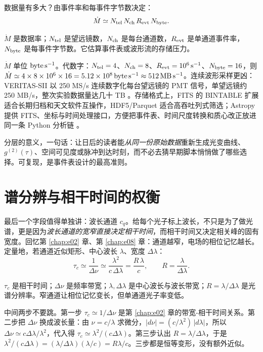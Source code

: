 数据量有多大？由事件率和每事件字节数决定：
\begin{equation}
  \dot{M}
  \simeq
  N_{\rm tel}\,N_{\rm ch}\,R_{\rm evt}\,N_{\rm byte}.
  \label{eq:e13-data-rate}
\end{equation}
\begin{formulaexplain}
\(\dot M\) 是数据率；\(N_{\rm tel}\) 是望远镜数，\(N_{\rm ch}\) 是每台通道数，\(R_{\rm evt}\) 是单通道事件率，\(N_{\rm byte}\) 是每事件字节数。它估算事件表或波形流的存储压力。
\end{formulaexplain}
\(\dot M\) 单位 \({\rm byte\,s^{-1}}\)。代数字：\(N_{\rm tel}=4\)、\(N_{\rm ch}=8\)、\(R_{\rm evt}=10^6\,{\rm s^{-1}}\)、\(N_{\rm byte}=16\)，则 \(\dot M\simeq4\times8\times10^6\times16=5.12\times10^8\,{\rm byte\,s^{-1}}\approx512\,{\rm MB\,s^{-1}}\)。连续波形采样更凶：VERITAS-SII 以 250 MS/s 连续数字化每台望远镜的 PMT 信号，单望远镜约 250 MB/s，整次实验数据量达几十 TB \citep{2020NatAs...4.1164A}。存储格式上，FITS 的 BINTABLE 扩展适合长期归档和天文软件互操作，HDF5/Parquet 适合高吞吐列式筛选；Astropy 提供 FITS、坐标与时间处理接口，方便把事件表、时间尺度转换和质心改正放进同一条 Python 分析链 \citep{2010A&A...524A..42P,2013A&A...558A..33A,2018AJ....156..123A}。

分层的意义，一句话：让日后的读者能\emph{从同一份原始数据}重新生成光变曲线、\(g^{(2)}(\tau)\)、空间可见度或脉冲到达时刻，而不必去猜早期脚本悄悄做了哪些选择。可复现，是事件表设计的最高准则。

\section{谱分辨与相干时间的权衡}
\label{sec:e13-spectral}

最后一个字段值得单独讲：波长通道 \(c_q\)。给每个光子标上波长，不只是为了做光谱，更是因为\emph{波长通道的宽窄直接决定相干时间}，而相干时间又决定相关峰的固有宽度。回忆第 \ref{chap:e02} 章、第 \ref{chap:e08} 章：通道越窄，电场的相位记忆越长。定量地，若通道近似矩形、中心波长 \(\lambda\)、宽度 \(\Delta\lambda\)：
\begin{equation}
  \tau_c
  \simeq
  \frac{1}{\Delta\nu}
  \simeq
  \frac{\lambda^2}{c\,\Delta\lambda}
  =
  \frac{R\,\lambda}{c},
  \qquad
  R=\frac{\lambda}{\Delta\lambda}.
  \label{eq:e13-coherence-time}
\end{equation}
\begin{formulaexplain}
\(\tau_c\) 是相干时间；\(\Delta\nu\) 是频率带宽；\(\lambda,\Delta\lambda\) 是中心波长与波长带宽；\(R=\lambda/\Delta\lambda\) 是光谱分辨率。窄通道让相位记忆变长，但单通道光子率变低。
\end{formulaexplain}
中间两步不要跳。第一步 \(\tau_c\simeq1/\Delta\nu\) 是第 \ref{chap:e02} 章的带宽-相干时间关系。第二步把 \(\Delta\nu\) 换成波长量：由 \(\nu=c/\lambda\) 求微分，\(|d\nu|=(c/\lambda^2)\,|d\lambda|\)，所以 \(\Delta\nu\simeq c\Delta\lambda/\lambda^2\)，代入得 \(\tau_c\simeq\lambda^2/(c\Delta\lambda)\)。第三步认出 \(R=\lambda/\Delta\lambda\)，于是 \(\lambda^2/(c\Delta\lambda)=(\lambda/\Delta\lambda)(\lambda/c)=R\lambda/c\)。三步都是恒等变形，没有额外近似。

